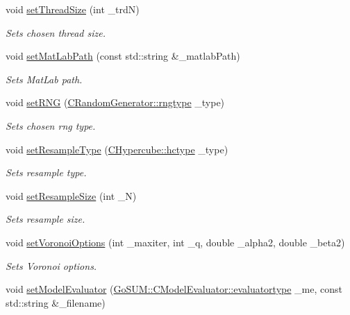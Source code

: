 \begin{DoxyCompactItemize}
void \hyperlink{class_go_s_u_m_1_1_c_container_acb1a50c65ffa0795537f8a1dae672895}{set\-Thread\-Size} (int \-\_\-trd\-N)
\begin{DoxyCompactList}\small\item\em Sets chosen thread size. \end{DoxyCompactList}\item 
void \hyperlink{class_go_s_u_m_1_1_c_container_af4c2c7dbe9944ba9170bf82031563454}{set\-Mat\-Lab\-Path} (const std\-::string \&\-\_\-matlab\-Path)
\begin{DoxyCompactList}\small\item\em Sets Mat\-Lab path. \end{DoxyCompactList}\item 
void \hyperlink{class_go_s_u_m_1_1_c_container_a5d6da068fda02b4ac8f8450fb48491c1}{set\-R\-N\-G} (\hyperlink{class_c_random_generator_a50566d64b5ada7e335fc3acd52d958f6}{C\-Random\-Generator\-::rngtype} \-\_\-type)
\begin{DoxyCompactList}\small\item\em Sets chosen rng type. \end{DoxyCompactList}\item 
void \hyperlink{class_go_s_u_m_1_1_c_container_a962569d63184d2cb64bd7eb51548ce01}{set\-Resample\-Type} (\hyperlink{class_go_s_u_m_1_1_c_hypercube_a9113655515864c06ea6d4f08d5195c90}{C\-Hypercube\-::hctype} \-\_\-type)
\begin{DoxyCompactList}\small\item\em Sets resample type. \end{DoxyCompactList}\item 
void \hyperlink{class_go_s_u_m_1_1_c_container_a01cb4d41a56adc911be804645441ee8b}{set\-Resample\-Size} (int \-\_\-\-N)
\begin{DoxyCompactList}\small\item\em Sets resample size. \end{DoxyCompactList}\item 
void \hyperlink{class_go_s_u_m_1_1_c_container_a4e7337e114f42f613967c9022f203c19}{set\-Voronoi\-Options} (int \-\_\-maxiter, int \-\_\-q, double \-\_\-alpha2, double \-\_\-beta2)
\begin{DoxyCompactList}\small\item\em Sets Voronoi options. \end{DoxyCompactList}\item 
void \hyperlink{class_go_s_u_m_1_1_c_container_a7ff3f16ae1bce4e14b4ed8376cdaac20}{set\-Model\-Evaluator} (\hyperlink{class_go_s_u_m_1_1_c_evaluator_a50058cbf6a2c5b94677045ee02b67db2}{Go\-S\-U\-M\-::\-C\-Model\-Evaluator\-::evaluatortype} \-\_\-me, const std\-::string \&\-\_\-filename)

\end{DoxyCompactItemize}
